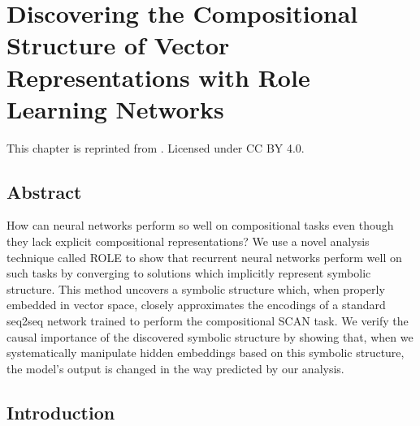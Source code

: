 \newcommand{\RLN}{ROLE}
\newcommand{\hs}{\hspace{1mm}}
\renewcommand{\t}[1]{{\mathtt{#1}}}
\renewcommand{\r}[1]{{\mathrm{#1}}}
\renewcommand{\b}[1]{{\mathbf{#1}}}
\newcommand{\mcal}[1]{{\mathcal{#1}}}
\newcommand{\rR}{\r{R}}
\newcommand{\rF}{\r{F}}
\newcommand{\bW}{{\mathbb{W}}}
\newcommand{\bU}{{\mathbb{U}}}
\newcommand{\rTarg}{r_{2^\r{ce}\mhyphen\r{arg}}}
\newcommand{\SCANnet}{SCAN-net}
\newcommand{\hi}[1]{{\color{blue} #1}}
\newcommand{\add}[1]{{\textbf{\color{blue} #1}}}
\newcommand{\del}[1]{{\textbf{\color{orange} #1}}}

\chapter{Discovering the Compositional Structure of Vector Representations with Role Learning Networks} \label{chap:chap-1}

\begin{singlespace}         %
    This chapter is reprinted from . Licensed under CC BY 4.0.
\end{singlespace} 


\section{Abstract}
    How can neural networks perform so well on compositional tasks even though they lack explicit compositional representations?
    We use a novel analysis technique called ROLE to show that recurrent neural networks perform well on such tasks by converging to solutions which implicitly represent symbolic structure. This method uncovers a symbolic structure which, when properly embedded in vector space, closely approximates the encodings of a standard seq2seq network trained to perform the compositional SCAN task. We verify the causal importance of the discovered symbolic structure by showing that, when we systematically manipulate hidden embeddings based on this symbolic structure, the model's output is changed in the way predicted by our analysis.

\section{Introduction} \label{sec:rldn-Intro}

